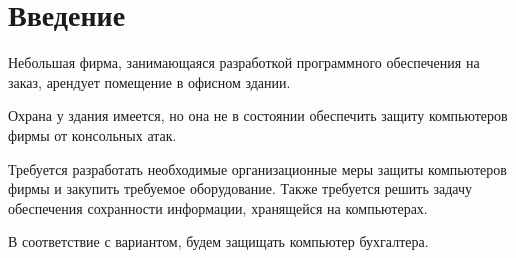 \section{Введение}

Небольшая фирма, занимающаяся разработкой программного обеспечения на заказ, арендует помещение в офисном здании.

Охрана у здания имеется, но она не в состоянии обеспечить защиту компьютеров фирмы от консольных атак. 

Требуется разработать необходимые организационные меры защиты компьютеров фирмы и закупить требуемое оборудование. Также требуется решить задачу обеспечения сохранности информации, хранящейся на компьютерах.

В соответствие с вариантом, будем защищать компьютер бухгалтера.
